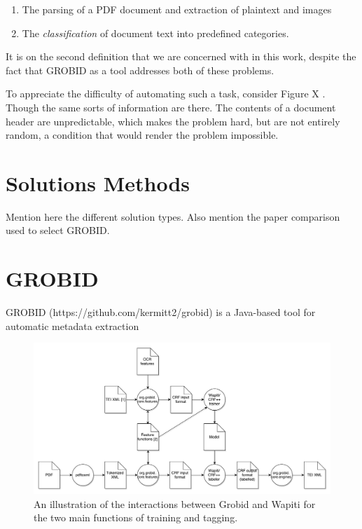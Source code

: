 \begin{enumerate}
\item The parsing of a PDF document and extraction of plaintext and images
\item The \emph{classification} of document text into predefined categories.
\end{enumerate}

It is on the second definition that we are concerned with in this work, despite the fact that GROBID as a tool addresses both of these problems.

To appreciate the difficulty of automating such a task, consider Figure X . Though the same sorts of information are there. The contents of a document header are unpredictable, which makes the problem hard, but are not entirely random, a condition that would render the problem impossible.


\section{Solutions Methods}

Mention here the different solution types. Also mention the paper comparison used to select GROBID.

\section{GROBID}
\label{sec:grobid}
GROBID (https://github.com/kermitt2/grobid) is a Java-based tool for automatic metadata extraction 

\begin{figure}[!ht]
\center
\includegraphics[width=\textwidth]{Figures/grobid.pdf}
\caption{An illustration of the interactions between Grobid and Wapiti for the two main functions of training and tagging.}
\label{fig:grobid}
\end{figure}

